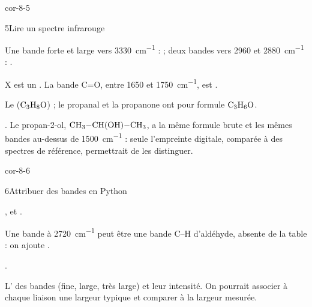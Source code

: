 \begin{blocLivre}{cor-8-5}
\begin{corrige}{5}{Lire un spectre infrarouge}
\begin{questions}
\item Une bande forte et large vers \qty{3330}{cm^{-1}} :  ; deux bandes vers 2960 et \qty{2880}{cm^{-1}} : .
\item X est un . La bande C=O, entre 1650 et \qty{1750}{cm^{-1}}, est .
\item Le  ($\ce{C3H8O}$) ; le propanal et la propanone ont pour formule $\ce{C3H6O}$.
\item {}. Le propan-2-ol, $\ce{CH3-CH(OH)-CH3}$, a la même formule brute et les mêmes bandes au-dessus de
\qty{1500}{cm^{-1}} : seule l'empreinte digitale, comparée à des spectres de référence, permettrait de les distinguer.
\end{questions}
\end{corrige}
\end{blocLivre}
\begin{blocLivre}{cor-8-6}
\begin{corrige}{6}{Attribuer des bandes en Python}
\begin{questions}
\item {},  et .
\item Une bande à \qty{2720}{cm^{-1}} peut être une bande C--H d'aldéhyde, absente de la table : on ajoute
.
\item {}.
\item L' des bandes (fine, large, très large) et leur intensité. On pourrait associer à chaque liaison une largeur
typique et comparer à la largeur mesurée.
\end{questions}
\end{corrige}
\end{blocLivre}

